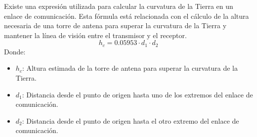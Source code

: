 \documentclass[
	12pt, %
	fleqn, %
	a4paper, %
	oneside, %
]{LegrandOrangeBook}
\begin{document}
\begin{definition}
Existe una expresión utilizada para calcular la curvatura de la Tierra en un enlace de comunicación. Esta fórmula está relacionada con el cálculo de la altura necesaria de una torre de antena para superar la curvatura de la Tierra y mantener la línea de visión entre el transmisor y el receptor.
\begin{equation}
h_c=0.05953\cdot d_1\cdot d_2
\label{eq:curvatura tierra}
\end{equation}
Donde:
\begin{itemize}
\item $h_c$: Altura estimada de la torre de antena para superar la curvatura de la Tierra.
\item $d_1$: Distancia desde el punto de origen hasta uno de los extremos del enlace de comunicación.
\item $d_2$: Distancia desde el punto de origen hasta el otro extremo del enlace de comunicación.
\end{itemize}
\end{definition}
\end{document}
